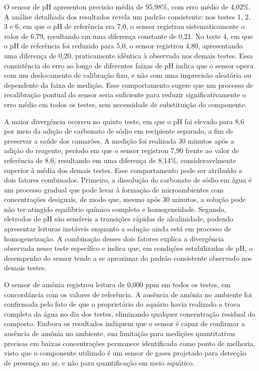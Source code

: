 \documentclass[11pt,a4paper]{article}
\begin{document}
O sensor de pH apresentou precisão média de 95,98\%, com erro médio de 4,02\%. A análise detalhada dos resultados revela um padrão consistente: nos testes 1, 2, 3 e 6, em que o pH de referência era 7,0, o sensor registrou sistematicamente o valor de 6,79, resultando em uma diferença constante de 0,21. No teste 4, em que o pH de referência foi reduzido para 5,0, o sensor registrou 4,80, apresentando uma diferença de 0,20, praticamente idêntica à observada nos demais testes. Essa consistência do erro ao longo de diferentes faixas de pH indica que o sensor opera com um deslocamento de calibração fixo, e não com uma imprecisão aleatória ou dependente da faixa de medição. Esse comportamento sugere que um processo de recalibração pontual do sensor seria suficiente para reduzir significativamente o erro médio em todos os testes, sem necessidade de substituição do componente.

A maior divergência ocorreu no quinto teste, em que o pH foi elevado para 8,6 por meio da adição de carbonato de sódio em recipiente separado, a fim de preservar a saúde dos camarões. A medição foi realizada 30 minutos após a adição do reagente, período em que o sensor registrou 7,90 frente ao valor de referência de 8,6, resultando em uma diferença de 8,14\%, consideravelmente superior à média dos demais testes. Esse comportamento pode ser atribuído a dois fatores combinados. Primeiro, a dissolução do carbonato de sódio em água é um processo gradual que pode levar à formação de microambientes com concentrações desiguais, de modo que, mesmo após 30 minutos, a solução pode não ter atingido equilíbrio químico completo e homogeneidade. Segundo, eletrodos de pH são sensíveis a transições rápidas de alcalinidade, podendo apresentar leituras instáveis enquanto a solução ainda está em processo de homogeneização. A combinação desses dois fatores explica a divergência observada nesse teste específico e indica que, em condições estabilizadas de pH, o desempenho do sensor tende a se aproximar do padrão consistente observado nos demais testes.

O sensor de amônia registrou leitura de 0,000 ppm em todos os testes, em concordância com os valores de referência. A ausência de amônia no ambiente foi confirmada pelo fato de que o proprietário do aquário havia realizado a troca completa da água no dia dos testes, eliminando qualquer concentração residual do composto. Embora os resultados indiquem que o sensor é capaz de confirmar a ausência de amônia no ambiente, sua limitação para medições quantitativas precisas em baixas concentrações permanece identificada como ponto de melhoria, visto que o componente utilizado é um sensor de gases projetado para detecção de presença no ar, e não para quantificação em meio aquático.
\end{document}
